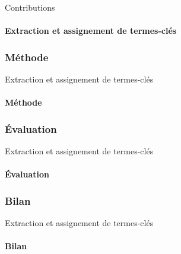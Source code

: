 \begin{frame}{Contributions}\framesubtitle{Extraction et assignement de termes-clés}
\end{frame}

\subsubsection{Méthode}
  \begin{frame}{Extraction et assignement de termes-clés}\framesubtitle{Méthode}
  \end{frame}

\subsubsection{Évaluation}
  \begin{frame}{Extraction et assignement de termes-clés}\framesubtitle{Évaluation}
  \end{frame}

\subsubsection{Bilan}
  \begin{frame}{Extraction et assignement de termes-clés}\framesubtitle{Bilan}
  \end{frame}

